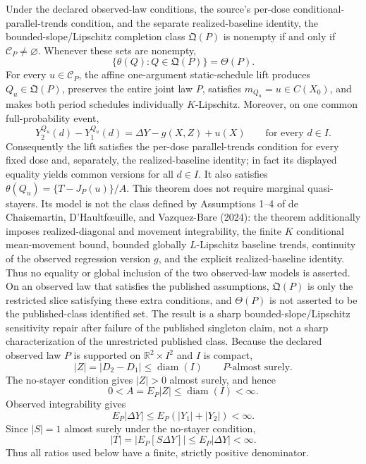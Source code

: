 Under the declared observed-law conditions, the source's per-dose conditional-parallel-trends condition, and the separate realized-baseline identity, the bounded-slope/Lipschitz completion class \(\mathfrak Q(P)\) is nonempty if and only if \(\mathcal C_P\neq\varnothing\). Whenever these sets are nonempty,
\[
\{\theta(Q):Q\in\mathfrak Q(P)\}=\Theta(P).
\]
For every \(u\in\mathcal C_P\), the affine one-argument static-schedule lift produces \(Q_u\in\mathfrak Q(P)\), preserves the entire joint law \(P\), satisfies \(m_{Q_u}=u\in C(X_0)\), and makes both period schedules individually \(K\)-Lipschitz. Moreover, on one common full-probability event,
\[
Y_2^{Q_u}(d)-Y_1^{Q_u}(d)=\Delta Y-g(X,Z)+u(X)
\qquad\text{for every }d\in I.
\]
Consequently the lift satisfies the per-dose parallel-trends condition for every fixed dose and, separately, the realized-baseline identity; in fact its displayed equality yields common versions for all \(d\in I\). It also satisfies \(\theta(Q_u)=\{T-J_P(u)\}/A\). This theorem does not require marginal quasi-stayers. Its model is not the class defined by Assumptions 1--4 of de Chaisemartin, D'Haultf\oe{}uille, and Vazquez-Bare (2024): the theorem additionally imposes realized-diagonal and movement integrability, the finite \(K\) conditional mean-movement bound, bounded globally \(L\)-Lipschitz baseline trends, continuity of the observed regression version \(g\), and the explicit realized-baseline identity. Thus no equality or global inclusion of the two observed-law models is asserted. On an observed law that satisfies the published assumptions, \(\mathfrak Q(P)\) is only the restricted slice satisfying these extra conditions, and \(\Theta(P)\) is not asserted to be the published-class identified set. The result is a sharp bounded-slope/Lipschitz sensitivity repair after failure of the published singleton claim, not a sharp characterization of the unrestricted published class.
Because the declared observed law \(P\) is supported on \(\mathbb R^2\times I^2\) and \(I\) is compact,
\[
|Z|=|D_2-D_1|\leq\operatorname{diam}(I)
\qquad P\text{-almost surely}.
\]
The no-stayer condition gives \(|Z|>0\) almost surely, and hence
\[
0<A=E_P|Z|\leq\operatorname{diam}(I)<\infty. \tag{1}
\]
Observed integrability gives
\[
E_P|\Delta Y|\leq E_P(|Y_1|+|Y_2|)<\infty.
\]
Since \(|S|=1\) almost surely under the no-stayer condition,
\[
|T|=|E_P[S\Delta Y]|\leq E_P|\Delta Y|<\infty. \tag{2}
\]
Thus all ratios used below have a finite, strictly positive denominator.

